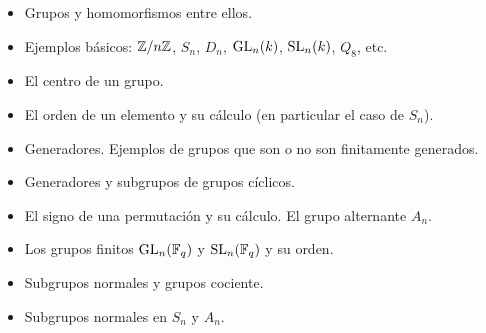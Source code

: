 \documentclass{article}
\begin{document}
\begin{itemize}
\item Grupos y homomorfismos entre ellos.

\item Ejemplos básicos: $\mathbb{Z}/n\mathbb{Z}$, $S_n$, $D_n$, $\operatorname{GL}_n (k)$, $\operatorname{SL}_n (k)$, $Q_8$, etc.

\item El centro de un grupo.

\item El orden de un elemento y su cálculo (en particular el caso de $S_n$).

\item Generadores. Ejemplos de grupos que son o no son finitamente generados.

\item Generadores y subgrupos de grupos cíclicos.

\item El signo de una permutación y su cálculo. El grupo alternante $A_n$.

\item Los grupos finitos $\operatorname{GL}_n (\mathbb{F}_q)$ y $\operatorname{SL}_n (\mathbb{F}_q)$ y su orden.

\item Subgrupos normales y grupos cociente.

\item Subgrupos normales en $S_n$ y $A_n$.
\end{itemize}
\end{document}
